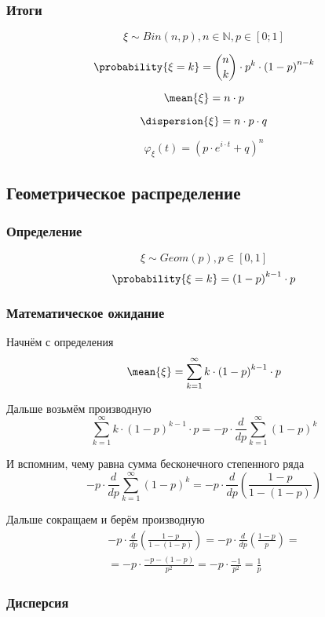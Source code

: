 \subsubsection{Итоги}
$$\xi \sim Bin\left( n,p \right), n \in \mathbb{N}, p \in \left[ 0;1 \right]$$

$$\probability{\xi = k}
    = \binom{n}{k} \cdot p^k \cdot \left( 1-p \right)^{n-k}$$

$$\mean{\xi} = n \cdot p$$

$$\dispersion{\xi} = n \cdot p \cdot q$$

$$\varphi_{\xi}\left( t \right) = \left( p \cdot e^{i\cdot t} + q \right)^n$$

\subsection{Геометрическое распределение}
\subsubsection{Определение}
$$\xi \sim Geom\left( p \right), p \in \left[ 0,1 \right]$$
$$\probability{\xi=k} = \left( 1-p \right)^{k-1} \cdot p$$
\subsubsection{Математическое ожидание}

Начнём с определения
$$\mean{\xi} = \sum_{k=1}^\infty k \cdot \left( 1-p \right)^{k-1} \cdot p$$

Дальше возьмём производную
$$\sum_{k=1}^\infty k \cdot \left( 1-p \right)^{k-1} \cdot p
    = - p \cdot \frac{d}{dp} \sum_{k=1}^\infty \left( 1-p \right)^k$$

И вспомним, чему равна сумма бесконечного степенного ряда
$$- p \cdot \frac{d}{dp} \sum_{k=1}^\infty \left( 1-p \right)^k
    = - p \cdot \frac{d}{dp} \left( \frac{1-p}{1-\left( 1-p \right)} \right)$$

Дальше сокращаем и берём производную
\begin{align*}
    - p \cdot \frac{d}{dp} \left( \frac{1-p}{1-\left( 1-p \right)} \right)
        = - p \cdot \frac{d}{dp} \left( \frac{1-p}{p} \right) = \\
        = - p \cdot \frac{- p - \left( 1-p \right)}{p^2}
        = - p \cdot \frac{-1}{p^2}
        = \frac{1}{p}
\end{align*}
\subsubsection{Дисперсия}

